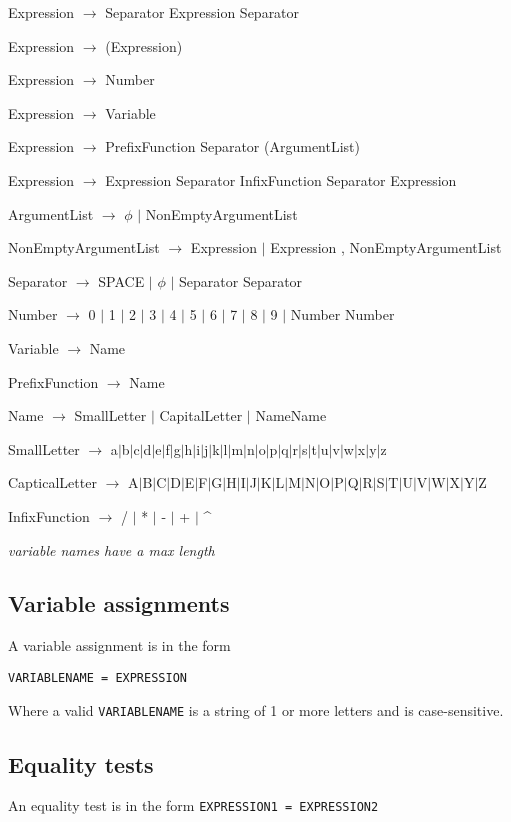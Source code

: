 \documentclass[11pt,a4paper]{article}
\begin{document}
Expression \(\rightarrow\) Separator Expression Separator

Expression \(\rightarrow\) (Expression)

Expression \(\rightarrow\) Number

Expression \(\rightarrow\) Variable

Expression \(\rightarrow\) PrefixFunction Separator (ArgumentList)

Expression \(\rightarrow\) Expression Separator InfixFunction Separator Expression

ArgumentList \(\rightarrow\) \(\phi\) $\mid$  NonEmptyArgumentList

NonEmptyArgumentList  \(\rightarrow\)  Expression $\mid$ Expression , NonEmptyArgumentList

Separator \(\rightarrow\) SPACE $\mid$ \(\phi\) $\mid$ Separator Separator

Number \(\rightarrow\) 0 $\mid$ 1 $\mid$ 2 $\mid$ 3 $\mid$ 4 $\mid$ 5 $\mid$ 6 $\mid$ 7 $\mid$ 8 $\mid$ 9 $\mid$ Number Number

Variable \(\rightarrow\) Name

PrefixFunction \(\rightarrow\) Name

Name \(\rightarrow\) SmallLetter $\mid$ CapitalLetter $\mid$ NameName

SmallLetter \(\rightarrow\) a$\mid$b$\mid$c$\mid$d$\mid$e$\mid$f$\mid$g$\mid$h$\mid$i$\mid$j$\mid$k$\mid$l$\mid$m$\mid$n$\mid$o$\mid$p$\mid$q$\mid$r$\mid$s$\mid$t$\mid$u$\mid$v$\mid$w$\mid$x$\mid$y$\mid$z

CapticalLetter \(\rightarrow\) A$\mid$B$\mid$C$\mid$D$\mid$E$\mid$F$\mid$G$\mid$H$\mid$I$\mid$J$\mid$K$\mid$L$\mid$M$\mid$N$\mid$O$\mid$P$\mid$Q$\mid$R$\mid$S$\mid$T$\mid$U$\mid$V$\mid$W$\mid$X$\mid$Y$\mid$Z

InfixFunction \(\rightarrow\) / $\mid$ * $\mid$ - $\mid$ + $\mid$ \^{}

\emph{variable names have a max length}


\subsection{Variable assignments}
A variable assignment is in the form

\texttt{VARIABLENAME = EXPRESSION}

Where a valid \texttt{VARIABLENAME} is a string of 1 or more letters and
is case-sensitive.
\subsection{Equality tests}
An equality test is in the form
\texttt{EXPRESSION1 = EXPRESSION2}
\end{document}
